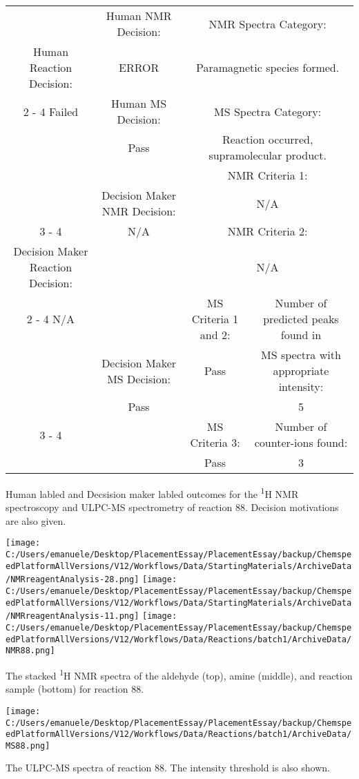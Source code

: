 \documentclass{article}%
\begin{document}
\begin{Decision Table}[H]%
\begin{tabular}{|c|c|c|c|}%
\hline%
&Human NMR Decision:&\multicolumn{2}{|c|}{NMR Spectra Category:}\\%
Human Reaction Decision:&ERROR&\multicolumn{2}{|c|}{Paramagnetic species formed.}\\%
\cline{2%
-%
4}%
Failed&Human MS Decision:&\multicolumn{2}{|c|}{MS Spectra Category:}\\%
&Pass&\multicolumn{2}{|c|}{Reaction occurred, supramolecular product.}\\%
\hline%
&&\multicolumn{2}{|c|}{NMR Criteria 1:}\\%
&Decision Maker NMR Decision:&\multicolumn{2}{|c|}{N/A}\\%
\cline{3%
-%
4}%
&N/A&\multicolumn{2}{|c|}{NMR Criteria 2:}\\%
Decision Maker Reaction Decision:&&\multicolumn{2}{|c|}{N/A}\\%
\cline{2%
-%
4}%
N/A&&MS Criteria 1 and 2:&Number of predicted peaks found in\\%
&Decision Maker MS Decision:&Pass&MS spectra with appropriate intensity:\\%
&Pass&&5\\%
\cline{3%
-%
4}%
&&MS Criteria 3:&Number of counter{-}ions found:\\%
&&Pass&3\\%
\hline%
\end{tabular}%
\caption{Human labled and Decsision maker labled outcomes for the \textsuperscript{1}H NMR spectroscopy and ULPC-MS spectrometry of reaction 88. Decision motivations are also given.}%
\end{Decision Table}%
\begin{NMR Spectra}[H]%
\begin{center}%
\texttt{[image: C:/Users/emanuele/Desktop/PlacementEssay/PlacementEssay/backup/ChemspeedPlatformAllVersions/V12/Workflows/Data/StartingMaterials/ArchiveData/NMRreagentAnalysis-28.png]}\hfill%
\texttt{[image: C:/Users/emanuele/Desktop/PlacementEssay/PlacementEssay/backup/ChemspeedPlatformAllVersions/V12/Workflows/Data/StartingMaterials/ArchiveData/NMRreagentAnalysis-11.png]}\hfill%
\texttt{[image: C:/Users/emanuele/Desktop/PlacementEssay/PlacementEssay/backup/ChemspeedPlatformAllVersions/V12/Workflows/Data/Reactions/batch1/ArchiveData/NMR88.png]}\hfill%
\end{center}%
\caption{The stacked \textsuperscript{1}H NMR spectra of the aldehyde (top), amine (middle), and reaction sample (bottom) for reaction 88.}%
\end{NMR Spectra}%
\begin{MS Spectra}[H]%
\begin{center}%
\texttt{[image: C:/Users/emanuele/Desktop/PlacementEssay/PlacementEssay/backup/ChemspeedPlatformAllVersions/V12/Workflows/Data/Reactions/batch1/ArchiveData/MS88.png]}\hfill%
\end{center}%
\caption{The ULPC-MS spectra of reaction 88. The intensity threshold is also shown.}%
\end{MS Spectra}%
\end{document}
